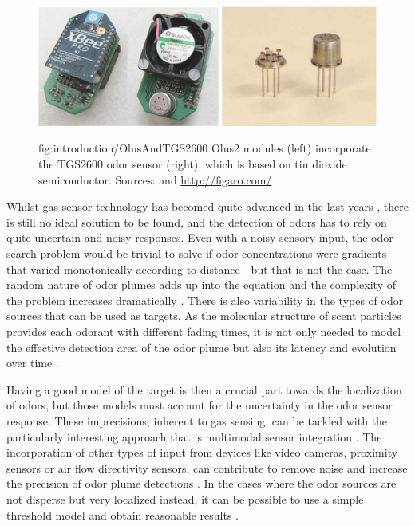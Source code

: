 \begin{figure}[h!]
\centerline{\mbox{\includegraphics[width=15cm]{images/introduction/OlusAndTGS2600.eps}}}
{fig:introduction/OlusAndTGS2600}{
Olus2 modules (left) incorporate the TGS2600 odor sensor (right), which is based on tin dioxide semiconductor. Sources: \cite{vazquez2013integracion} and \url{http://figaro.com/}}
\end{figure}

Whilst gas-sensor technology has becomed quite advanced in the last years \cite{pearce2003handbook}, there is still no ideal solution to be found, and the detection of odors has to rely on quite uncertain and noisy responses.
Even with a noisy sensory input, the odor search problem would be trivial to solve if odor concentrations were gradients that varied monotonically according to distance - but that is not the case. The random nature of odor plumes adds up into the equation and the complexity of the problem increases dramatically \cite{Torney2009}.
There is also variability in the types of odor sources that can be used as targets. As the molecular structure of scent particles provides each odorant with different fading times, it is not only needed to model the effective detection area of the odor plume but also its latency and evolution over time \cite{Mcgill2011}.


Having a good model of the target is then a crucial part towards the localization of odors, but those models must account for the uncertainty in the odor sensor response. These imprecisions, inherent to gas sensing, can be tackled with the particularly interesting approach that is multimodal sensor integration \cite{Hein24072012, song2011olfaction, arleo07}. The incorporation of other types of input from devices like video cameras, proximity sensors or air flow directivity sensors, can contribute to remove noise and increase the precision of odor plume detections \cite{Marjovi2013, Hayes02distributedodor}.
In the cases where the odor sources are not disperse but very localized instead, it can be possible to use a simple threshold model and obtain reasonable results \cite{vazquez2013integracion, acosta2013diseno}.




